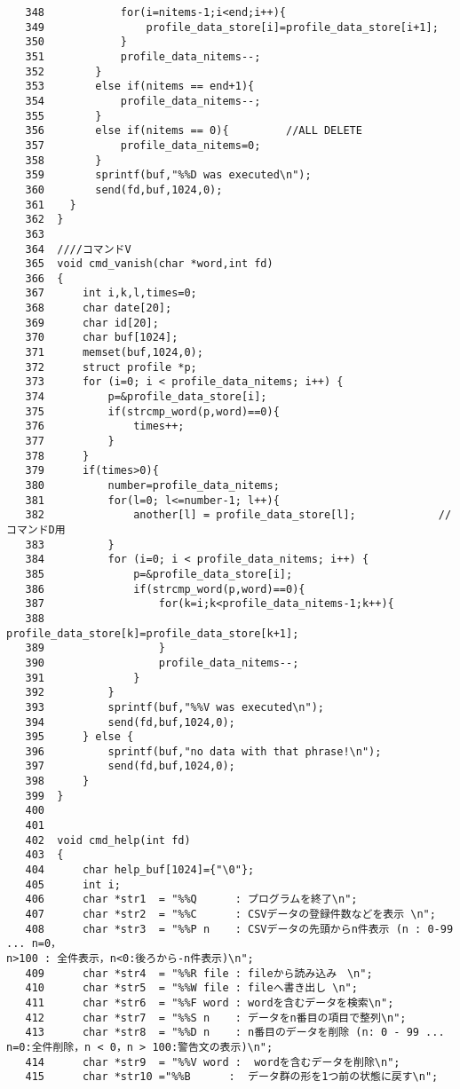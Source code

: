 \documentclass{jarticle}[11pt]
\begin{document}
\begin{verbatim}
   348	          for(i=nitems-1;i<end;i++){
   349	              profile_data_store[i]=profile_data_store[i+1];  
   350	          }
   351	          profile_data_nitems--;
   352	      }
   353	      else if(nitems == end+1){
   354	          profile_data_nitems--;
   355	      }
   356	      else if(nitems == 0){         //ALL DELETE
   357	          profile_data_nitems=0;
   358	      }
   359	      sprintf(buf,"%%D was executed\n");
   360	      send(fd,buf,1024,0);
   361	  }
   362	}
   363	
   364	////コマンドV
   365	void cmd_vanish(char *word,int fd)
   366	{
   367	    int i,k,l,times=0;
   368	    char date[20];
   369	    char id[20];
   370	    char buf[1024];
   371	    memset(buf,1024,0);
   372	    struct profile *p;
   373	    for (i=0; i < profile_data_nitems; i++) {
   374	        p=&profile_data_store[i];
   375	        if(strcmp_word(p,word)==0){
   376	            times++;
   377	        }
   378	    }
   379	    if(times>0){
   380	        number=profile_data_nitems;
   381	        for(l=0; l<=number-1; l++){
   382	            another[l] = profile_data_store[l];             //コマンドD用
   383	        }
   384	        for (i=0; i < profile_data_nitems; i++) {
   385	            p=&profile_data_store[i];
   386	            if(strcmp_word(p,word)==0){
   387	                for(k=i;k<profile_data_nitems-1;k++){
   388	                    profile_data_store[k]=profile_data_store[k+1];  
   389	                }
   390	                profile_data_nitems--;
   391	            }
   392	        }
   393	        sprintf(buf,"%%V was executed\n");
   394	        send(fd,buf,1024,0);
   395	    } else {
   396	        sprintf(buf,"no data with that phrase!\n");
   397	        send(fd,buf,1024,0);
   398	    }
   399	}
   400	
   401	
   402	void cmd_help(int fd)
   403	{
   404	    char help_buf[1024]={"\0"};
   405	    int i;
   406	    char *str1  = "%%Q      : プログラムを終了\n";   
   407	    char *str2  = "%%C      : CSVデータの登録件数などを表示 \n";
   408	    char *str3  = "%%P n    : CSVデータの先頭からn件表示 (n : 0-99 ... n=0，
n>100 : 全件表示，n<0:後ろから-n件表示)\n";
   409	    char *str4  = "%%R file : fileから読み込み　\n";
   410	    char *str5  = "%%W file : fileへ書き出し \n";
   411	    char *str6  = "%%F word : wordを含むデータを検索\n";     
   412	    char *str7  = "%%S n    : データをn番目の項目で整列\n";   
   413	    char *str8  = "%%D n    : n番目のデータを削除 (n: 0 - 99 ... n=0:全件削除，n < 0，n > 100:警告文の表示)\n"; 
   414	    char *str9  = "%%V word :  wordを含むデータを削除\n";
   415	    char *str10 ="%%B      :  データ群の形を1つ前の状態に戻す\n";

\end{verbatim}
\end{document}
